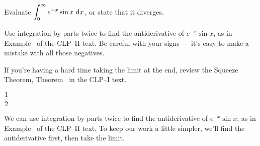\begin{Mquestion}
Evaluate $\displaystyle\int_0^\infty e^{-x}\sin x~\mathrm{d}x$, or state that it diverges.
\end{Mquestion}
\begin{hint}
Use integration by parts twice to find the antiderivative of $e^{-x}\sin x$, as in Example~ of the CLP--II text. Be careful with your signs ---
it's easy to make a mistake with all those negatives.

If you're having a hard time taking the limit at the end, review the Squeeze Theorem, Theorem~ in the CLP--I text.
\end{hint}
\begin{answer}
$\dfrac{1}{2}$
\end{answer}
\begin{solution}
We can use integration by parts twice to find the antiderivative of $e^{-x}\sin x$, as in Example~ of the CLP--II text. To keep our work a little simpler, we'll find the antiderivative first, then take the limit.


\end{solution}
